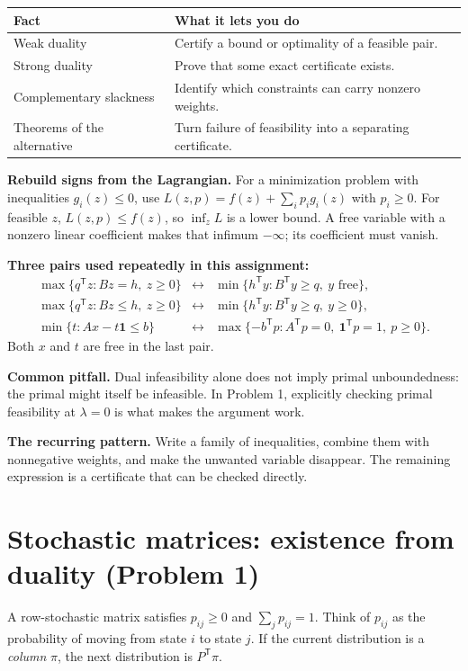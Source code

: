 \documentclass[11pt]{article}
\newenvironment{pitfall}{\begingroup\colorlet{shadecolor}{warncolor}\begin{shaded}\noindent\textbf{Common pitfall.} }{\end{shaded}\endgroup}
\newcommand{\T}{^{\mathsf T}}
\newcommand{\ones}{\mathbf 1}
\begin{document}
\begin{center}\renewcommand{\arraystretch}{1.35}
\begin{tabular}{@{}p{}p{}@{}}\toprule
\textbf{Fact} & \textbf{What it lets you do}\\\midrule
Weak duality & Certify a bound or optimality of a feasible pair.\\
Strong duality & Prove that some exact certificate exists.\\
Complementary slackness & Identify which constraints can carry nonzero weights.\\
Theorems of the alternative & Turn failure of feasibility into a separating certificate.\\\bottomrule
\end{tabular}
\end{center}

\textbf{Rebuild signs from the Lagrangian.} For a minimization problem
with inequalities $g_i(z)\le0$, use
$L(z,p)=f(z)+\sum_i p_i g_i(z)$ with $p_i\ge0$.
For feasible $z$, $L(z,p)\le f(z)$, so $\inf_zL$ is a lower bound.
A free variable with a nonzero linear coefficient makes that infimum
$-\infty$; its coefficient must vanish.

\textbf{Three pairs used repeatedly in this assignment:}
\[
\begin{array}{rcl}
\max\{q\T z:Bz=h,\ z\ge0\}
&\longleftrightarrow&\min\{h\T y:B\T y\ge q,\ y\text{ free}\},\\[5pt]
\max\{q\T z:Bz\le h,\ z\ge0\}
&\longleftrightarrow&\min\{h\T y:B\T y\ge q,\ y\ge0\},\\[5pt]
\min\{t:Ax-t\ones\le b\}
&\longleftrightarrow&\max\{-b\T p:A\T p=0,\ \ones\T p=1,\ p\ge0\}.
\end{array}
\]
Both $x$ and $t$ are free in the last pair.

\begin{pitfall}
Dual infeasibility alone does not imply primal unboundedness: the primal
might itself be infeasible. In Problem 1, explicitly checking primal
feasibility at $\lambda=0$ is what makes the argument work.
\end{pitfall}

\textbf{The recurring pattern.} Write a family of inequalities, combine
them with nonnegative weights, and make the unwanted variable disappear.
The remaining expression is a certificate that can be checked directly.

\newpage
\section{Stochastic matrices: existence from duality (Problem 1)}
A row-stochastic matrix satisfies $p_{ij}\ge0$ and
$\sum_jp_{ij}=1$. Think of $p_{ij}$ as the probability of moving from
state $i$ to state $j$. If the current distribution is a \emph{column}
$\pi$, the next distribution is $P\T\pi$.
\end{document}
